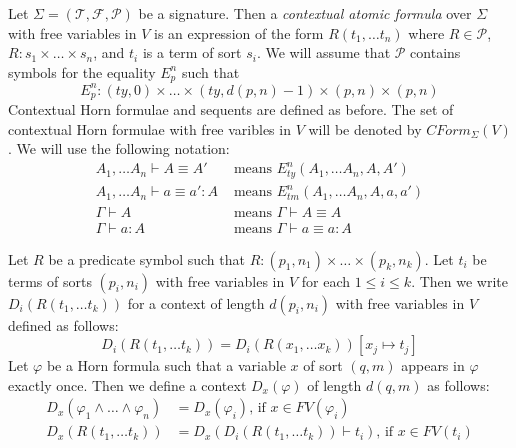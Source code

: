 \documentclass{amsart}
\theoremstyle{definition}
\theoremstyle{remark}
\newcommand{\deq}{\equiv}
\numberwithin{figure}{section}
\begin{document}
Let $\Sigma = (\mathcal{T}, \mathcal{F}, \mathcal{P})$ be a signature.
Then a \emph{contextual atomic formula} over $\Sigma$ with free variables in $V$ is an expression of the form 
$R(t_1, \ldots t_n)$ where $R \in \mathcal{P}$, $R : s_1 \times \ldots \times s_n$, and $t_i$ is a term of sort $s_i$.
We will assume that $\mathcal{P}$ contains symbols for the equality $E^n_p$ such that
\[ E^n_p : (ty,0) \times \ldots \times (ty,d(p,n)-1) \times (p,n) \times (p,n) \]
Contextual Horn formulae and sequents are defined as before.
The set of contextual Horn formulae with free varibles in $V$ will be denoted by $CForm_\Sigma(V)$.
We will use the following notation:
\begin{align*}
A_1, \ldots A_n \vdash A \deq A' & \text{ means } E^n_{ty}(A_1, \ldots A_n, A, A') \\
A_1, \ldots A_n \vdash a \deq a' : A & \text{ means } E^n_{tm}(A_1, \ldots A_n, A, a, a') \\
\Gamma \vdash A & \text{ means } \Gamma \vdash A \deq A \\
\Gamma \vdash a : A & \text{ means } \Gamma \vdash a \deq a : A
\end{align*}

Let $R$ be a predicate symbol such that $R : (p_1,n_1) \times \ldots \times (p_k,n_k)$.
Let $t_i$ be terms of sorts $(p_i,n_i)$ with free variables in $V$ for each $1 \leq i \leq k$.
Then we write $D_i(R(t_1, \ldots t_k))$ for a context of length $d(p_i,n_i)$ with free variables in $V$ defined as follows:
\[ D_i(R(t_1, \ldots t_k)) = D_i(R(x_1, \ldots x_k))[x_j \mapsto t_j] \]
Let $\varphi$ be a Horn formula such that a variable $x$ of sort $(q,m)$ appears in $\varphi$ exactly once.
Then we define a context $D_x(\varphi)$ of length $d(q,m)$ as follows:
\begin{align*}
D_x(\varphi_1 \land \ldots \land \varphi_n) & = D_x(\varphi_i) \text{, if $x \in FV(\varphi_i)$} \\
D_x(R(t_1, \ldots t_k)) & = D_x(D_i(R(t_1, \ldots t_k)) \vdash t_i) \text{, if $x \in FV(t_i)$}
\end{align*}
\end{document}

